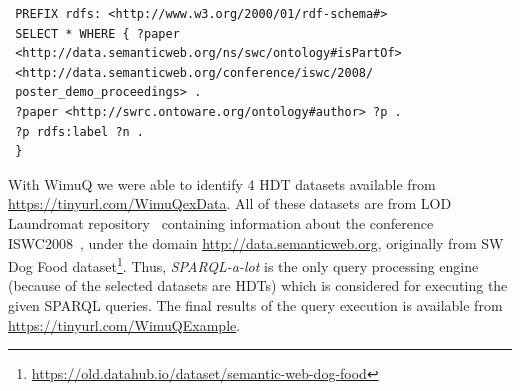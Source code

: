  \begin{verbatim}
 PREFIX rdfs: <http://www.w3.org/2000/01/rdf-schema#>
 SELECT * WHERE { ?paper 
 <http://data.semanticweb.org/ns/swc/ontology#isPartOf> 
 <http://data.semanticweb.org/conference/iswc/2008/
 poster_demo_proceedings> .
 ?paper <http://swrc.ontoware.org/ontology#author> ?p .
 ?p rdfs:label ?n .
 }
 \end{verbatim}

 






With WimuQ we were able to identify 4 HDT datasets available from 
\url{https://tinyurl.com/WimuQexData}. All of these datasets are
from LOD Laundromat repository~\cite{beek2014lod} containing information about the conference ISWC2008~\cite{sheth2008semantic}, under the domain \url{http://data.semanticweb.org}, originally from SW Dog Food dataset\footnote{\url{https://old.datahub.io/dataset/semantic-web-dog-food}}. Thus, \emph{SPARQL-a-lot} is the only query processing engine (because of the selected datasets are HDTs) which is considered for executing the given SPARQL queries. The final results of the query execution is available from \url{https://tinyurl.com/WimuQExample}. 



